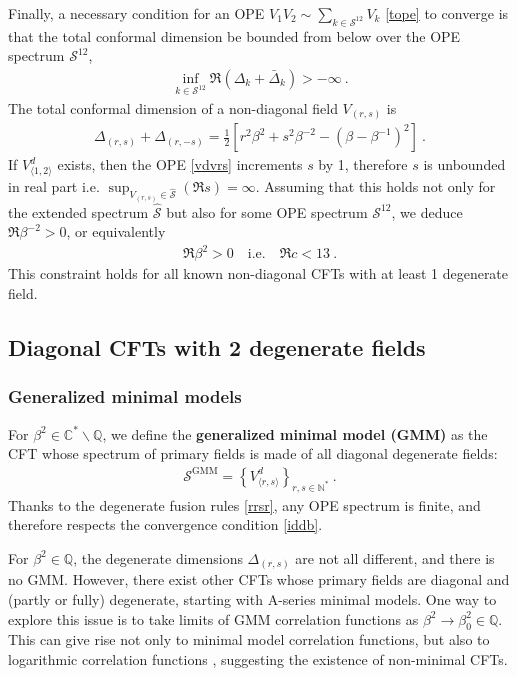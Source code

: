 \documentclass[12pt, a4paper]{article}
\newcommand{\myindex}[1]{\textbf{\boldmath #1}}
\theoremstyle{break}
\begin{document}
Finally, a necessary condition for an OPE $V_1V_2\sim \sum_{k\in\mathcal{S}^{12}}V_k$ \eqref{tope} to converge is that the total conformal dimension be bounded from below over the OPE spectrum $\mathcal{S}^{12}$,
\begin{align}
 \boxed{\inf_{k\in \mathcal{S}^{12}}\Re\left(\Delta_k+\bar\Delta_k\right) > -\infty} \ . 
 \label{iddb}
\end{align}
The total conformal dimension of a non-diagonal field $V_{(r,s)}$ is 
\begin{align}
 \Delta_{(r,s)}+\Delta_{(r,-s)} = \frac12\left[ r^2\beta^{2} + s^2\beta^{-2}  -\left(\beta-\beta^{-1}\right)^2\right]\ .
\end{align}
If $V^d_{\langle 1,2\rangle}$ exists, then the OPE \eqref{vdvrs} increments $s$ by 1, therefore $s$ is unbounded in real part i.e. $\sup_{V_{(r,s)}\in \widehat{\mathcal{S}}} \left(\Re s\right) = \infty$. Assuming that this holds not only for the extended spectrum $\widehat{\mathcal{S}}$ but also for some OPE spectrum $\mathcal{S}^{12}$, we deduce $\Re\beta^{-2}>0$, or equivalently 
\begin{align}
 \boxed{\Re\beta^2 > 0 \quad \text{i.e.} \quad \Re c < 13}\ .
 \label{rbp}
\end{align}
This constraint holds for all known non-diagonal CFTs with at least 1 degenerate field. 

\subsection{Diagonal CFTs with 2 degenerate fields}\label{sec:diag}

\subsubsection{Generalized minimal models}\label{sec:gmm}

For $\beta^2\in\mathbb{C}^*\backslash\mathbb{Q}$, we define the \myindex{generalized minimal model (GMM)} as the CFT whose spectrum of primary fields is made of all diagonal degenerate fields:
\begin{align}
 \boxed{\mathcal{S}^\text{GMM} = \left\{ V^d_{\langle r,s\rangle}\right\}_{r,s\in\mathbb{N}^*}} \ . 
\end{align}
Thanks to the degenerate fusion rules \eqref{rrsr}, any OPE spectrum is finite, and therefore respects the convergence condition \eqref{iddb}.

For $\beta^2\in \mathbb{Q}$, the degenerate dimensions $\Delta_{(r,s)}$ are not all different, and there is no GMM. However, there exist other CFTs whose primary fields are diagonal and (partly or fully) degenerate, starting with A-series minimal models. One way to explore this issue is to take limits of GMM correlation functions as $\beta^2\to \beta^2_0\in \mathbb{Q}$. This can give rise not only to minimal model correlation functions, but also to logarithmic correlation functions \cite{rib18}, suggesting the existence of non-minimal CFTs. 
\end{document}
